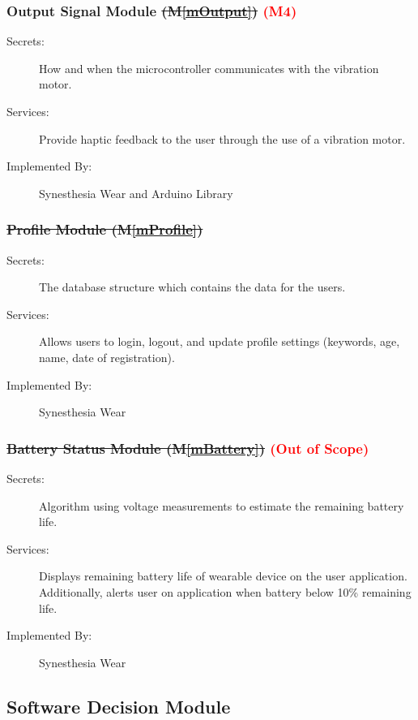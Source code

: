 \documentclass[12pt, titlepage]{article}
\newcommand{\mref}[1]{M\ref{#1}}
\begin{document}
\subsubsection{Output Signal Module \sout{(\mref{mOutput})} \textcolor{red}{(M4)}}
\begin{description}
  \item[Secrets:] How and when the microcontroller communicates with the vibration motor.
  \item[Services:] Provide haptic feedback to the user through the use of a vibration motor.
  \item[Implemented By:] Synesthesia Wear and Arduino Library
  \end{description}

\subsubsection{\sout{Profile Module (\mref{mProfile})}}
\begin{description}
  \item[Secrets:] The database structure which contains the data for the users.
  \item[Services:] Allows users to login, logout, and update profile settings (keywords, age, name, date of registration).
  \item[Implemented By:] Synesthesia Wear
  \end{description}

\subsubsection{\sout{Battery Status Module (\mref{mBattery})} \textcolor{red}{(Out of Scope)}} 
\begin{description}
  \item[Secrets:] Algorithm using voltage measurements to estimate the remaining battery life.
  \item[Services:] Displays remaining battery life of wearable device on the user application. Additionally, alerts user on application when battery below 10\% remaining life.
  \item[Implemented By:] Synesthesia Wear
  \end{description}


\subsection{Software Decision Module}
\end{document}
